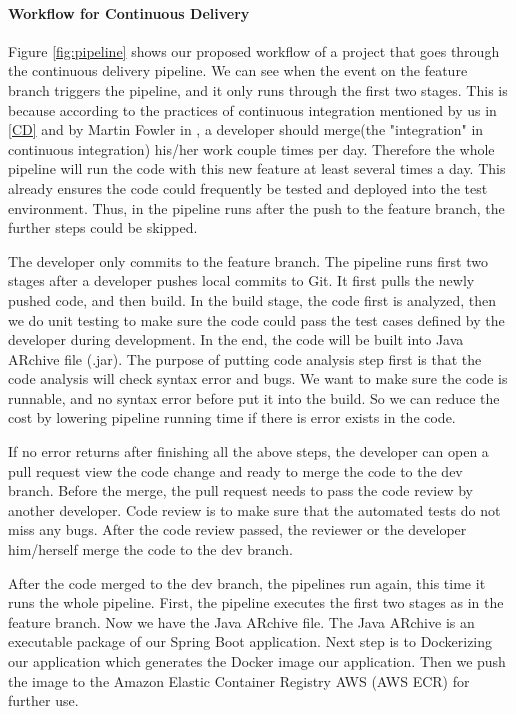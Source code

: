 \paragraph[]{Workflow for Continuous Delivery}
\label{workflow}
Figure \ref{fig:pipeline} shows our proposed workflow of a project that goes through the continuous delivery pipeline.
We can see when the event on the feature branch triggers the pipeline, and it only runs through the first two stages. This is because according to the practices of continuous integration mentioned by us in \ref{CD} and by Martin Fowler in \cite{fowler2006continuous}, a developer should merge(the "integration" in continuous integration) his/her work couple times per day. Therefore the whole pipeline will run the code with this new feature at least several times a day. This already ensures the code could frequently be tested and deployed into the test environment. Thus, in the pipeline runs after the push to the feature branch, the further steps could be skipped. 
\par
 The developer only commits to the feature branch. The pipeline runs first two stages after a developer pushes local commits to Git. It first pulls the newly pushed code, and then build. In the build stage, the code first is analyzed, then we do unit testing to make sure the code could pass the test cases defined by the developer during development. In the end, the code will be built into Java ARchive file (.jar). The purpose of putting code analysis step first is that the code analysis will check syntax error and bugs. We want to make sure the code is runnable, and no syntax error before put it into the build. So we can reduce the cost by lowering pipeline running time if there is error exists in the code. 
\par
If no error returns after finishing all the above steps, the developer can open a pull request view the code change and ready to merge the code to the dev branch. Before the merge, the pull request needs to pass the code review by another developer. Code review is to make sure that the automated tests do not miss any bugs. After the code review passed, the reviewer or the developer him/herself merge the code to the dev branch.  
\par
After the code merged to the dev branch, the pipelines run again, this time it runs the whole pipeline. First, the pipeline executes the first two stages as in the feature branch. Now we have the Java ARchive file. The Java ARchive is an executable package of our Spring Boot application. Next step is to Dockerizing our application which generates the Docker image our application. Then we push the image to the Amazon Elastic Container Registry AWS (AWS ECR) for further use.
